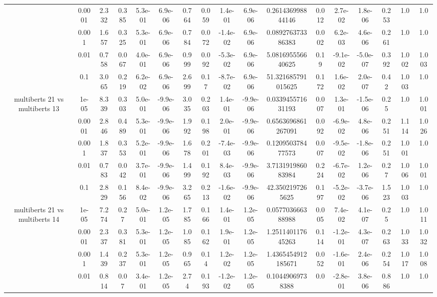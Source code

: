 \begin{tabular}{|c|c|c|c|c|c|c|c|c|c|c|c|c|c|c|c|c|}
 & 0.0001 & 2.332 & 0.385 & 5.3e-01 & 6.9e-06 & 0.764 & 0.059 & 1.4e-01 & 6.9e-06 & 0.261436998844146 & 0.012 & 2.7e-02 & 1.8e-06 & 0.253 & 1.0 & 1.0 \\
 & 0.001 & 1.657 & 0.325 & 5.3e-01 & 6.9e-06 & 0.784 & 0.072 & -1.4e-02 & 6.9e-06 & 0.089276373386383 & 0.002 & 6.2e-03 & 4.6e-06 & 0.261 & 1.0 & 1.0 \\
 & 0.01 & 0.758 & 0.067 & 4.0e-01 & 6.9e-06 & 0.999 & 0.092 & -5.3e-02 & 6.9e-06 & 5.081695556640625 & 0.19 & -9.1e-02 & -5.0e-07 & 0.392 & 1.002 & 1.003 \\
 & 0.1 & 3.065 & 0.219 & 6.2e-02 & 6.9e-06 & 2.699 & 0.17 & -8.7e-02 & 6.9e-06 & 51.321685791015625 & 0.172 & 1.6e-02 & 2.0e-07 & 0.42 & 1.003 & 1.0 \\
\hline
\multirow{5}{*}{multiberts 21 vs multiberts 13} & 1e-05 & 8.339 & 0.303 & 5.0e-01 & -9.9e-06 & 3.035 & 0.203 & 1.4e-01 & -9.9e-06 & 0.033945571631193 & 0.007 & 1.3e-01 & -1.5e-06 & 0.25 & 1.0 & 1.001 \\
 & 0.0001 & 2.846 & 0.489 & 5.3e-01 & -9.9e-06 & 1.992 & 0.198 & 2.0e-01 & -9.9e-06 & 0.6563696861267091 & 0.092 & -6.9e-02 & 4.8e-06 & 0.251 & 1.114 & 1.026 \\
 & 0.001 & 1.837 & 0.353 & 5.2e-01 & -9.9e-06 & 1.678 & 0.201 & -7.4e-03 & -9.9e-06 & 0.120950378477573 & 0.007 & -9.5e-02 & -1.8e-06 & 0.251 & 1.001 & 1.0 \\
 & 0.01 & 0.783 & 0.042 & 3.7e-01 & -9.9e-06 & 1.499 & 0.192 & 8.4e-03 & -9.9e-06 & 3.713191986083984 & 0.224 & -6.7e-02 & 1.2e-06 & 0.27 & 1.006 & 1.001 \\
 & 0.1 & 2.829 & 0.156 & 8.4e-02 & -9.9e-06 & 3.265 & 0.213 & -1.6e-02 & -9.9e-06 & 42.3502197265625 & 0.197 & -5.2e-02 & -3.7e-06 & 1.523 & 1.003 & 1.0 \\
\hline
\multirow{5}{*}{multiberts 21 vs multiberts 14} & 1e-05 & 7.274 & 0.27 & 5.0e-01 & 1.2e-05 & 1.785 & 0.166 & 1.4e-01 & 1.2e-05 & 0.057703666388988 & 0.005 & 7.4e-02 & 4.1e-07 & 0.25 & 1.0 & 1.011 \\
 & 0.0001 & 2.337 & 0.381 & 5.3e-01 & 1.2e-05 & 1.085 & 0.162 & 1.9e-01 & 1.2e-05 & 1.251140117645263 & 0.114 & -1.2e-01 & 4.3e-07 & 0.263 & 1.033 & 1.032 \\
 & 0.001 & 1.439 & 0.237 & 5.3e-01 & 1.2e-05 & 0.965 & 0.14 & 1.2e-02 & 1.2e-05 & 1.4365454912185671 & 0.052 & -1.6e-01 & 2.4e-06 & 0.254 & 1.017 & 1.008 \\
 & 0.01 & 0.814 & 0.07 & 3.4e-01 & 1.2e-05 & 2.74 & 0.193 & -1.2e-02 & 1.2e-05 & 0.10449069738388 & 0.0 & -2.8e-01 & 3.8e-06 & 0.886 & 1.0 & 1.0 \\

\end{tabular}
